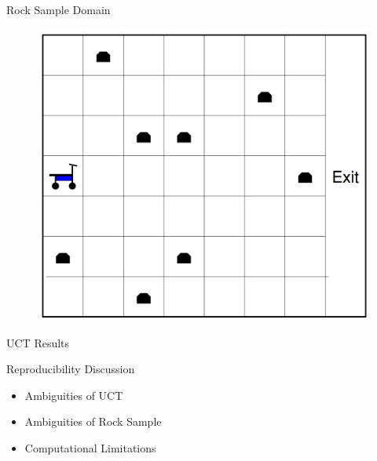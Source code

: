 \documentclass{beamer}
\begin{document}
\begin{frame}{Rock Sample Domain}

\begin{figure}
\includegraphics[page=1,height=.55\textheight,width=.5\textwidth]{rock_sample_domain.png}
\end{figure}


\end{frame}

\begin{frame}{UCT Results}
\begin{figure}[h]
\centering
{}
\hspace{1mm}
\end{figure}
\end{frame}

\begin{frame}{Reproducibility Discussion}
\begin{itemize}
\item Ambiguities of UCT
\item Ambiguities of Rock Sample
\item Computational Limitations
\end{itemize}
\end{frame}
\end{document}
